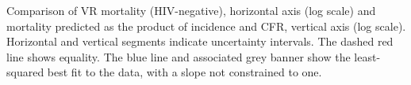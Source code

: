 Comparison of VR mortality (HIV-negative), horizontal axis (log scale) and mortality predicted as the product of incidence and CFR, vertical axis (log scale). Horizontal and vertical segments indicate uncertainty intervals. The dashed red line shows equality. The blue line and associated grey banner show the least-squared best fit to the data, with a slope not constrained to one. 